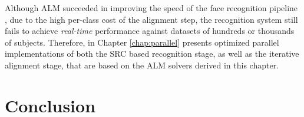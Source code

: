 Although ALM succeeded in improving the speed of the face recognition pipeline
\cite{WagnerA2011-PAMI}, due to the high per-class cost of the alignment step,
the recognition system still fails to achieve \emph{real-time} performance
against datasets of hundreds or thousands of subjects.  
Therefore, in Chapter \ref{chap:parallel} presents optimized parallel implementations
of both the SRC based recognition stage, as well as the iterative alignment stage,
that are based on the ALM solvers derived in this chapter.




%
%
%

\section{Conclusion}



